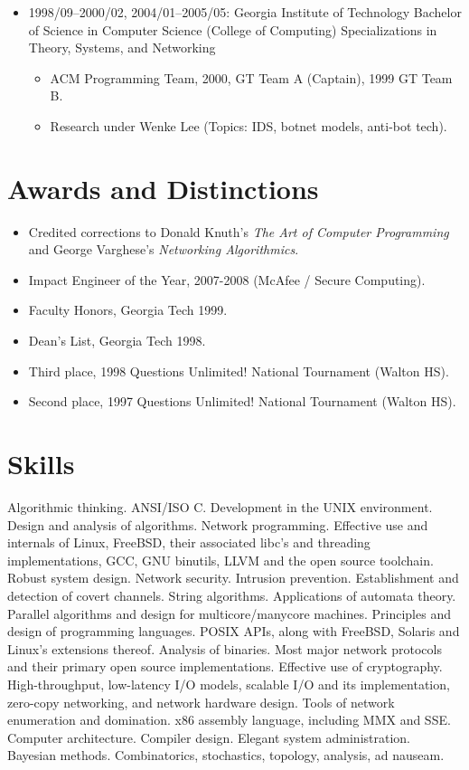 \documentclass[11pt]{article}
\newenvironment{tightitemize}
{\begin{itemize}
  \setlength{\itemsep}{1pt}
  \setlength{\parskip}{0pt}
  \setlength{\parsep}{0pt}}
{\end{itemize}}
\begin{document}
\begin{tightitemize}
\item 1998/09--2000/02, 2004/01--2005/05: Georgia Institute of Technology
Bachelor of Science in Computer Science (College of Computing)
Specializations in Theory, Systems, and Networking

\begin{tightitemize}
\item ACM Programming Team, 2000, GT Team A (Captain), 1999 GT Team B.
\item Research under Wenke Lee (Topics: IDS, botnet models, anti-bot tech).
\end{tightitemize}

\end{tightitemize}

\section{Awards and Distinctions}

\begin{tightitemize}
\item Credited corrections to Donald Knuth's \textit{The Art of Computer Programming}
   and George Varghese's \textit{Networking Algorithmics}.
\item Impact Engineer of the Year, 2007-2008 (McAfee / Secure Computing).
\item Faculty Honors, Georgia Tech 1999.
\item Dean's List, Georgia Tech 1998.
\item Third place, 1998 Questions Unlimited! National Tournament (Walton HS).
\item Second place, 1997 Questions Unlimited! National Tournament (Walton HS).
\end{tightitemize}

\section{Skills}

Algorithmic thinking. ANSI/ISO C. Development in the UNIX environment. Design
and analysis of algorithms. Network programming. Effective use and internals
of Linux, FreeBSD, their associated libc's and threading implementations,
GCC, GNU binutils, LLVM and the open source toolchain. Robust system design.
Network security. Intrusion prevention. Establishment and detection of covert
channels. String algorithms. Applications of automata theory. Parallel
algorithms and design for multicore/manycore machines. Principles and design
of programming languages. POSIX APIs, along with FreeBSD, Solaris and Linux's
extensions thereof. Analysis of binaries. Most major network protocols and
their primary open source implementations. Effective use of cryptography.
High-throughput, low-latency I/O models, scalable I/O and its implementation,
zero-copy networking, and network hardware design. Tools of network
enumeration and domination. x86 assembly language, including MMX and SSE.
Computer architecture. Compiler design. Elegant system administration.
Bayesian methods. Combinatorics, stochastics, topology, analysis, ad nauseam.
\end{document}
